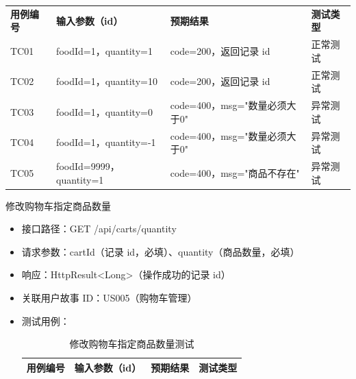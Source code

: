 \begin{levellist}
\begin{levellist}
\begin{itemize}
\begin{longtable}{>{\centering\arraybackslash}m{1.7cm} >{\centering\arraybackslash}m{3cm} >{\centering\arraybackslash}m{6.3cm} >{\centering\arraybackslash}m{2cm}}
                      \multicolumn{4}{c}{{\tablename\ \thetable{} 续表}}                                \\
                      \toprule
                      \textbf{用例编号} & \textbf{输入参数（id）}      & \textbf{预期结果}          & \textbf{测试类型} \\
                      \midrule
                      \endhead

                      \bottomrule
                      \endfoot

                      TC01          & foodId=1，quantity=1    & code=200，返回记录 id       & 正常测试          \\
                      TC02          & foodId=1，quantity=10   & code=200，返回记录 id       & 正常测试          \\
                      TC03          & foodId=1，quantity=0    & code=400，msg="数量必须大于0" & 异常测试          \\
                      TC04          & foodId=1，quantity=-1   & code=400，msg="数量必须大于0" & 异常测试          \\
                      TC05          & foodId=9999，quantity=1 & code=400，msg="商品不存在"   & 异常测试          \\
                  \end{longtable}
        \end{itemize}

        \item 修改购物车指定商品数量
        \begin{itemize}
            \item 接口路径：GET /api/carts/quantity
            \item 请求参数：cartId（记录 id，必填）、quantity（商品数量，必填）
            \item 响应：HttpResult<Long>（操作成功的记录 id）
            \item 关联用户故事 ID：US005（购物车管理）
            \item 测试用例：
                  \begin{longtable}{>{\centering\arraybackslash}m{1.7cm} >{\centering\arraybackslash}m{3cm} >{\centering\arraybackslash}m{6.3cm} >{\centering\arraybackslash}m{2cm}}

                      \caption{修改购物车指定商品数量测试} \label{tab:training}                              \\

                      \toprule
                      \textbf{用例编号} & \textbf{输入参数（id）} & \textbf{预期结果}         & \textbf{测试类型} \\
                      \midrule
                      \endfirsthead


\end{longtable}
\end{itemize}
\end{levellist}
\end{levellist}
